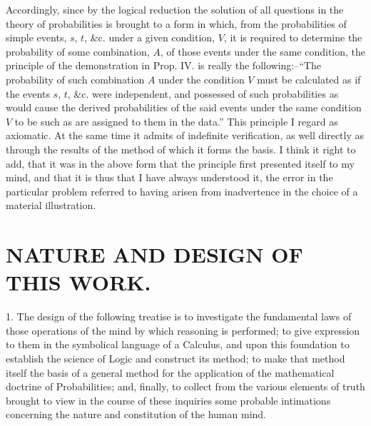 \documentclass[oneside]{book}
\begin{document}
Accordingly, since by the logical reduction the solution of all questions in
the theory of probabilities is brought to a form in which, from the probabilities
of simple events, $s$, $t$, \&c. under a given condition, $V$, it is required to determine
the probability of some combination, $A$, of those events under the same condition,
the principle of the demonstration in Prop. IV. is really the following:--``The
probability of such combination $A$ under the condition $V$ must be calculated
as if the events $s$, $t$, \&c. were independent, and possessed of such probabilities
as would cause the derived probabilities of the said events under the same
condition $V$ to be such as are assigned to them in the data.'' This principle I
regard as axiomatic. At the same time it admits of indefinite verification, as
well directly as through the results of the method of which it forms the basis.
I think it right to add, that it was in the above form that the principle first presented
itself to my mind, and that it is thus that I have always understood it,
the error in the particular problem referred to having arisen from inadvertence
in the choice of a material illustration.



\mainmatter

\chapter[NATURE AND DESIGN OF THIS WORK]{\large NATURE AND DESIGN OF THIS WORK.}




1. The design of the following treatise is to investigate the
fundamental laws of those operations of the mind by which
reasoning is performed; to give expression to them in the symbolical
language of a Calculus, and upon this foundation to establish the
science of Logic and construct its method; to make that method
itself the basis of a general method for the application of the mathematical
doctrine of Probabilities; and, finally, to collect from
the various elements of truth brought to view in the course of
these inquiries some probable intimations concerning the nature
and constitution of the human mind.
\end{document}

